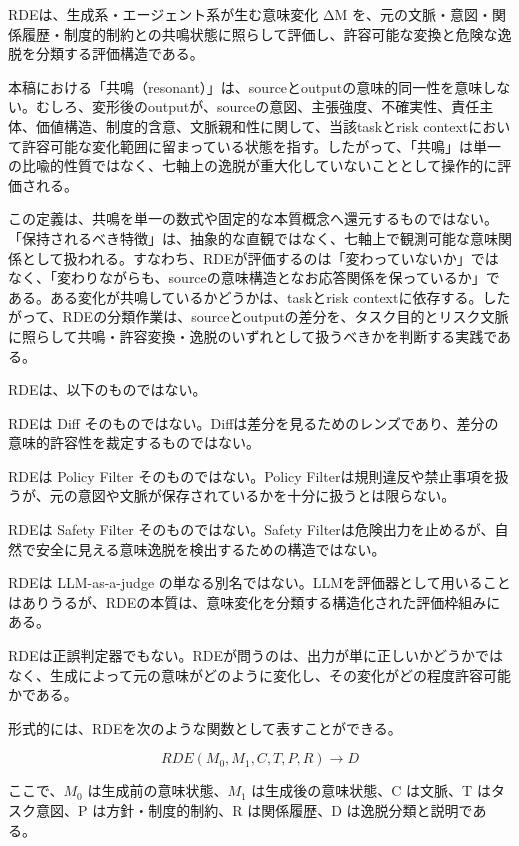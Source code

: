 \documentclass[
  a4paper]{ltjsarticle}
\begin{document}
RDEは、生成系・エージェント系が生む意味変化 ΔM
を、元の文脈・意図・関係履歴・制度的制約との共鳴状態に照らして評価し、許容可能な変換と危険な逸脱を分類する評価構造である。

本稿における「共鳴（resonant）」は、sourceとoutputの意味的同一性を意味しない。むしろ、変形後のoutputが、sourceの意図、主張強度、不確実性、責任主体、価値構造、制度的含意、文脈親和性に関して、当該taskとrisk contextにおいて許容可能な変化範囲に留まっている状態を指す。したがって、「共鳴」は単一の比喩的性質ではなく、七軸上の逸脱が重大化していないこととして操作的に評価される。

この定義は、共鳴を単一の数式や固定的な本質概念へ還元するものではない。「保持されるべき特徴」は、抽象的な直観ではなく、七軸上で観測可能な意味関係として扱われる。すなわち、RDEが評価するのは「変わっていないか」ではなく、「変わりながらも、sourceの意味構造となお応答関係を保っているか」である。ある変化が共鳴しているかどうかは、taskとrisk contextに依存する。したがって、RDEの分類作業は、sourceとoutputの差分を、タスク目的とリスク文脈に照らして共鳴・許容変換・逸脱のいずれとして扱うべきかを判断する実践である。

RDEは、以下のものではない。

RDEは Diff
そのものではない。Diffは差分を見るためのレンズであり、差分の意味的許容性を裁定するものではない。

RDEは Policy Filter そのものではない。Policy
Filterは規則違反や禁止事項を扱うが、元の意図や文脈が保存されているかを十分に扱うとは限らない。

RDEは Safety Filter そのものではない。Safety
Filterは危険出力を止めるが、自然で安全に見える意味逸脱を検出するための構造ではない。

RDEは LLM-as-a-judge
の単なる別名ではない。LLMを評価器として用いることはありうるが、RDEの本質は、意味変化を分類する構造化された評価枠組みにある。

RDEは正誤判定器でもない。RDEが問うのは、出力が単に正しいかどうかではなく、生成によって元の意味がどのように変化し、その変化がどの程度許容可能かである。

形式的には、RDEを次のような関数として表すことができる。

\begin{equation}
RDE(M_0, M_1, C, T, P, R) \rightarrow D
\end{equation}

ここで、\(M_0\) は生成前の意味状態、\(M_1\) は生成後の意味状態、C
は文脈、T はタスク意図、P は方針・制度的制約、R は関係履歴、D
は逸脱分類と説明である。
\end{document}
